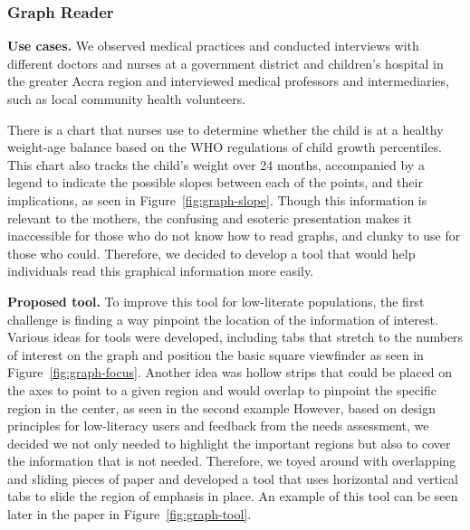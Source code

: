 \documentclass{sig-alternate}
\begin{document}
\subsubsection{Graph Reader}
\label{sec:graph}

\textbf{Use cases.}
We observed medical practices and conducted interviews with different doctors and nurses at a government district and children's hospital in the greater Accra region and interviewed medical professors and intermediaries, such as local community health volunteers. 

There is a chart that nurses use to determine whether the child is at a healthy weight-age balance based on the WHO regulations of child growth percentiles. This chart also tracks the child's weight over 24 months, accompanied by a legend to indicate the possible slopes between each of the points, and their implications, as seen in Figure~\ref{fig:graph-slope}. Though this information is relevant to the mothers, the confusing and esoteric presentation makes it inaccessible for those who do not know how to read graphs, and clunky to use for those who could. Therefore, we decided to develop a tool that would help individuals read this graphical information more easily.

\textbf{Proposed tool.}
To improve this tool for low-literate populations, the first challenge is finding a way pinpoint the location of the information of interest. Various ideas for tools were developed, including tabs that stretch to the numbers of interest on the graph and position the basic square viewfinder as seen in Figure~\ref{fig:graph-focus}. Another idea was hollow strips that could be placed on the axes to point to a given region and would overlap to pinpoint the specific region in the center, as seen in the second example However, based on design principles for low-literacy users and feedback from the needs assessment, we decided we not only needed to highlight the important regions but also to cover the information that is not needed. Therefore, we toyed around with overlapping and sliding pieces of paper and developed a tool that uses horizontal and vertical tabs to slide the region of emphasis in place. An example of this tool can be seen later in the paper in Figure~\ref{fig:graph-tool}.
\end{document}
